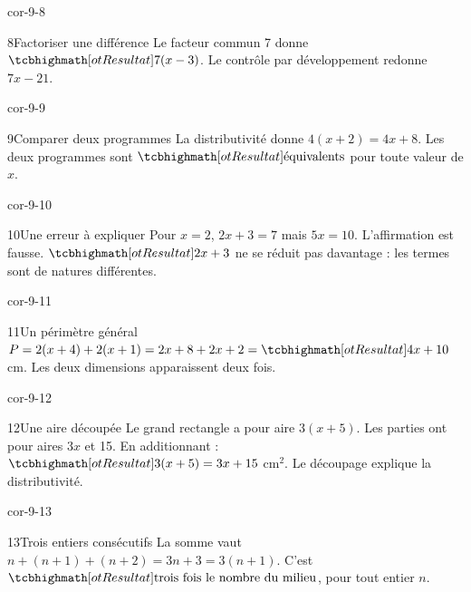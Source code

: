 \begin{blocLivre}{cor-9-8}\begin{corrige}{8}{Factoriser une différence}
Le facteur commun 7 donne $\res{7(x-3)}$. Le contrôle par développement redonne $7x-21$.
\end{corrige}\end{blocLivre}
\begin{blocLivre}{cor-9-9}\begin{corrige}{9}{Comparer deux programmes}
La distributivité donne $4(x+2)=4x+8$. Les deux programmes sont $\res{\text{équivalents}}$ pour toute valeur de $x$.
\end{corrige}\end{blocLivre}
\begin{blocLivre}{cor-9-10}\begin{corrige}{10}{Une erreur à expliquer}
Pour $x=2$, $2x+3=7$ mais $5x=10$. L’affirmation est fausse. $\res{2x+3}$ ne se réduit pas davantage : les termes sont de natures différentes.
\end{corrige}\end{blocLivre}
\begin{blocLivre}{cor-9-11}\begin{corrige}{11}{Un périmètre général}
$P=2(x+4)+2(x+1)=2x+8+2x+2=\res{4x+10}$ cm. Les deux dimensions apparaissent deux fois.
\label{fig-cor-9-11}
\end{corrige}\end{blocLivre}
\begin{blocLivre}{cor-9-12}\begin{corrige}{12}{Une aire découpée}
Le grand rectangle a pour aire $3(x+5)$. Les parties ont pour aires $3x$ et 15. En additionnant : $\res{3(x+5)=3x+15}$ cm$^2$. Le découpage explique la distributivité.
\label{fig-cor-9-12}
\end{corrige}\end{blocLivre}
\begin{blocLivre}{cor-9-13}\begin{corrige}{13}{Trois entiers consécutifs}
La somme vaut $n+(n+1)+(n+2)=3n+3=3(n+1)$. C’est $\res{\text{trois fois le nombre du milieu}}$, pour tout entier $n$.
\end{corrige}\end{blocLivre}
